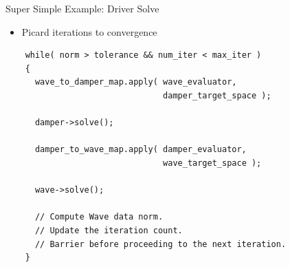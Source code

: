 \documentclass{beamer}
\begin{document}
\begin{frame}[fragile]{Super Simple Example: Driver Solve}

  \begin{itemize}
  \item Picard iterations to convergence
  \end{itemize}

  \begin{lstlisting}
    while( norm > tolerance && num_iter < max_iter )
    {
      wave_to_damper_map.apply( wave_evaluator, 
                                damper_target_space );

      damper->solve();

      damper_to_wave_map.apply( damper_evaluator, 
                                wave_target_space );

      wave->solve();
      
      // Compute Wave data norm.
      // Update the iteration count.
      // Barrier before proceeding to the next iteration.
    }
  \end{lstlisting}

\end{frame}

\end{document}
